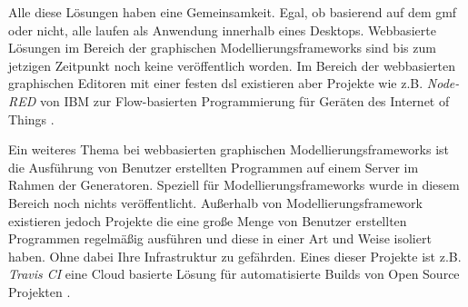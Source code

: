 Alle diese Lösungen haben eine Gemeinsamkeit. Egal, ob basierend auf dem \ac{gmf} oder nicht, alle laufen als Anwendung innerhalb eines Desktops. Webbasierte Lösungen im Bereich der graphischen Modellierungsframeworks sind bis zum jetzigen Zeitpunkt noch keine veröffentlich worden. Im Bereich der webbasierten graphischen Editoren mit einer festen \ac{dsl} existieren aber Projekte wie z.B. \textit{Node-RED} von IBM zur Flow-basierten Programmierung für Geräten des Internet of Things \cite{node_red}.

Ein weiteres Thema bei webbasierten graphischen Modellierungsframeworks ist die Ausführung von Benutzer erstellten Programmen auf einem Server im Rahmen der Generatoren. Speziell für Modellierungsframeworks wurde in diesem Bereich noch nichts veröffentlicht. Außerhalb von Modellierungsframework existieren jedoch Projekte die eine große Menge von Benutzer erstellten Programmen regelmäßig ausführen und diese in einer Art und Weise isoliert haben. Ohne dabei Ihre Infrastruktur zu gefährden. Eines dieser Projekte ist z.B. \textit{Travis CI} eine Cloud basierte Lösung für automatisierte Builds von Open Source Projekten \cite{tracis_ci}.

